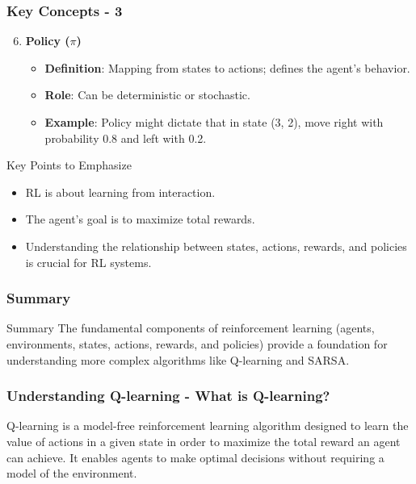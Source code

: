\documentclass{beamer}
\begin{document}
\begin{frame}[fragile]
    \frametitle{Key Concepts - 3}
    \begin{enumerate}
        \setcounter{enumi}{5} %
        \item \textbf{Policy (\(\pi\))}
        \begin{itemize}
            \item \textbf{Definition}: Mapping from states to actions; defines the agent's behavior.
            \item \textbf{Role}: Can be deterministic or stochastic.
            \item \textbf{Example}: Policy might dictate that in state (3, 2), move right with probability 0.8 and left with 0.2.
        \end{itemize}
    \end{enumerate}
    
    \begin{block}{Key Points to Emphasize}
        \begin{itemize}
            \item RL is about learning from interaction.
            \item The agent's goal is to maximize total rewards.
            \item Understanding the relationship between states, actions, rewards, and policies is crucial for RL systems.
        \end{itemize}
    \end{block}
\end{frame}

\begin{frame}[fragile]
    \frametitle{Summary}
    \begin{block}{Summary}
        The fundamental components of reinforcement learning (agents, environments, states, actions, rewards, and policies) provide a foundation for understanding more complex algorithms like Q-learning and SARSA.
    \end{block}
\end{frame}

\begin{frame}[fragile]
    \frametitle{Understanding Q-learning - What is Q-learning?}
    Q-learning is a model-free reinforcement learning algorithm designed to learn the value of actions in a given state in order to maximize the total reward an agent can achieve. 
    It enables agents to make optimal decisions without requiring a model of the environment.
\end{frame}
\end{document}
